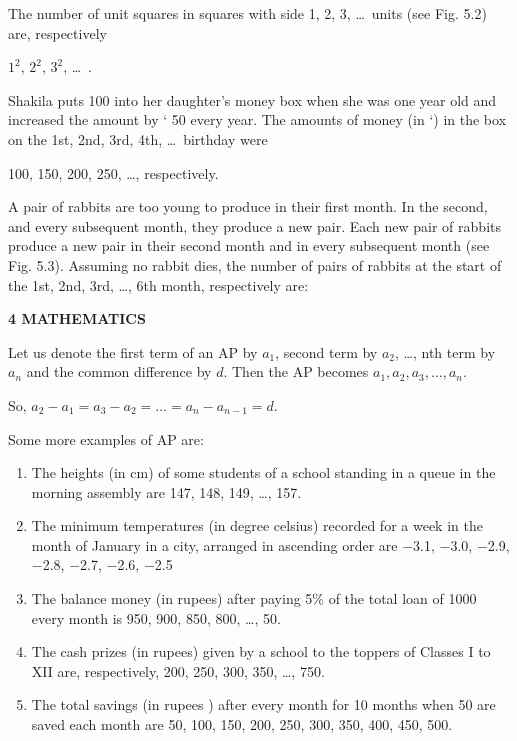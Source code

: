 \documentclass[12pt,a4paper]{book}
\begin{document}
\begin{list}{()}{%
  \setlength{\leftmargin}{20pt}
  \setlength{\itemsep}{15pt}
}

\item The number of unit squares in squares with side 1, 2, 3, \ldots\ units (see Fig. 5.2)
are, respectively
\begin{center}
$1^2$, $2^2$, $3^2$, \ldots\ .
\end{center}



\noindent\item Shakila puts 100 into her daughter's money box when she was one year old
and increased the amount by ` 50 every year. The amounts of money (in `) in the
box on the 1st, 2nd, 3rd, 4th, \ldots\ birthday were
\begin{center}
100, 150, 200, 250, \ldots, respectively.
\end{center}

\item A pair of rabbits are too young to produce in their first month. In the second, and
every subsequent month, they produce a new pair. Each new pair of rabbits
produce a new pair in their second month and in every subsequent month (see
Fig. 5.3). Assuming no rabbit dies, the number of pairs of rabbits at the start of
the 1st, 2nd, 3rd, \ldots, 6th month, respectively are:
\end{list}

\vspace{0.15cm}
\newpage

\noindent\textbf{4 \hfill MATHEMATICS}

\noindent Let us denote the first term of an AP by $a_1$, second term by $a_2$, \ldots, nth term by
$a_n$ and the common difference by $d$. Then the AP becomes
$a_1, a_2, a_3, \ldots, a_n$.

So, $a_2 - a_1 = a_3 - a_2 = \ldots = a_n - a_{n-1} = d$.

Some more examples of AP are:
\begin{enumerate}[label=(\alph*), itemsep=1pt]
    \item The heights (in cm) of some students of a school standing in a queue in the
morning assembly are 147, 148, 149, \ldots, 157.
    \item The minimum temperatures (in degree celsius) recorded for a week in the
month of January in a city, arranged in ascending order are
$-$3.1, $-$3.0, $-$2.9, $-$2.8, $-$2.7, $-$2.6, $-$2.5
    \item The balance money (in rupees) after paying 5\% of the total loan of  1000 every
month is 950, 900, 850, 800, \ldots, 50.
    \item The cash prizes (in rupees) given by a school to the toppers of Classes I to XII are,
respectively, 200, 250, 300, 350, \ldots, 750.
    \item The total savings (in rupees
    ) after every month for 10 months when  50 are saved
each month are 50, 100, 150, 200, 250, 300, 350, 400, 450, 500.
\end{enumerate}
\end{document}
